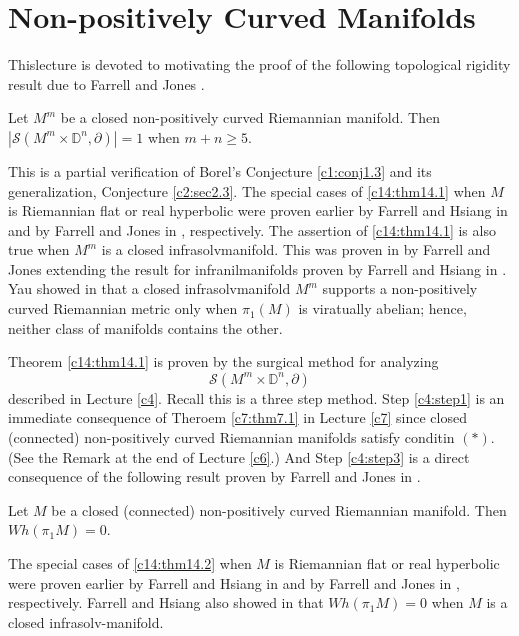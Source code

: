 \chapter{Non-positively Curved Manifolds}

This\pageoriginale lecture is devoted to motivating the proof of the
following topological rigidity result due to Farrell and Jones
\cite{43}.

\begin{thm}\label{c14:thm14.1}
  Let $M^m$ be a closed non-positively curved Riemannian
  manifold. Then $|\mathcal{S} (M^m \times \mathbb{D}^n, \partial)|=1$
  when $m + n \geq 5$.
\end{thm}

\begin{remark*}
  This is a partial verification of Borel's Conjecture
  \ref{c1:conj1.3} and its generalization, Conjecture
  \ref{c2:sec2.3}. The special cases of \ref{c14:thm14.1} when $M$ is
  Riemannian flat or real hyperbolic were proven earlier by Farrell
  and Hsiang in \cite{32} and by Farrell and Jones in \cite{38},
  respectively. The assertion of \ref{c14:thm14.1} is also true when
  $M^m$ is a closed infrasolvmanifold. This was proven in \cite{37} by
  Farrell and Jones extending the result for infranilmanifolds proven
  by Farrell and Hsiang in \cite{32}. Yau showed in \cite{98} that a
  closed infrasolvmanifold $M^m$ supports a non-positively curved
  Riemannian metric only when $\pi_1 (M)$ is viratually abelian;
  hence, neither class of manifolds contains the other.
\end{remark*}

Theorem \ref{c14:thm14.1} is proven by the surgical method for
analyzing 
$$
\mathcal{S}(M^m \times \mathbb{D}^n, \partial)
$$ 
described
in Lecture \ref{c4}. Recall this is a three step method. Step
\ref{c4:step1} is an immediate consequence of Theroem \ref{c7:thm7.1}
in Lecture \ref{c7} since closed (connected) non-positively curved
Riemannian manifolds satisfy conditin $(*)$. (See the Remark at the
end of Lecture \ref{c6}.) And Step \ref{c4:step3} is a direct
consequence of the following result proven by Farrell and Jones in
\cite{42}. 

\begin{thm}\label{c14:thm14.2}
  Let $M$ be a closed (connected) non-positively curved Riemannian
  manifold. Then $Wh (\pi_1 M)=0$.
\end{thm}

\begin{remark*}
  The special cases of \ref{c14:thm14.2} when $M$ is Riemannian flat
  or real hyperbolic were proven earlier by Farrell and Hsiang in
  \cite{29} and by Farrell and Jones in \cite{36},
  respectively. Farrell and Hsiang also showed in \cite{31} that $Wh
  (\pi_1 M)=0$ when $M$ is a closed infrasolv-manifold.
\end{remark*}

